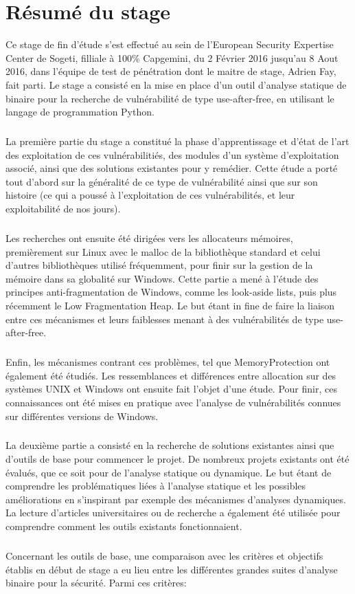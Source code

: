 \section*{Résumé du stage}
Ce stage de fin d'étude s'est effectué au sein de l'European Security Expertise Center de Sogeti, filliale à 100\% Capgemini, du 2 Février 2016 jusqu'au 8 Aout 2016, dans
l'équipe de test de pénétration dont le maitre de stage, Adrien Fay, fait parti. Le stage a consisté en la mise en place d'un outil d'analyse statique de binaire pour la recherche
de vulnérabilité de type use-after-free, en utilisant le langage de programmation Python.
\subparagraph{}
La première partie du stage a constitué la phase d'apprentissage et d'état de l'art des exploitation de ces vulnérabilitiés, des modules d'un système d'exploitation associé, ainsi que des solutions
existantes pour y remédier. Cette étude a porté tout d'abord sur la généralité de ce type de vulnérabilité ainsi que sur son histoire (ce qui a poussé à l'exploitation de ces vulnérabilités, et leur
exploitabilité de nos jours).
\subparagraph{}
Les recherches ont ensuite été dirigées vers les allocateurs mémoires, premièrement sur Linux avec le malloc de la bibliothèque standard et celui d'autres bibliothèques
utilisé fréquemment, pour finir sur la gestion de la mémoire dans sa globalité sur Windows. Cette partie a mené à l'étude des principes anti-fragmentation de Windows, comme les look-aside lists, puis
plus récemment le Low Fragmentation Heap. Le but étant in fine de faire la liaison entre ces mécanismes et leurs faiblesses menant à des vulnérabilités de type use-after-free.
\subparagraph{}
Enfin, les mécanismes contrant ces problèmes, tel que MemoryProtection ont également été étudiés. Les ressemblances et différences entre allocation sur des systèmes UNIX et Windows ont
ensuite fait l'objet d'une étude. Pour finir, ces connaissances ont été mises en pratique avec l'analyse de vulnérabilités connues sur différentes versions de Windows.
\subparagraph{}
La deuxième partie a consisté en la recherche de solutions existantes ainsi que d'outils de base pour commencer le projet. De nombreux projets existants ont été évalués, que ce soit pour de l'analyse statique ou dynamique. Le but étant de comprendre les problématiques liées à l'analyse statique et les possibles améliorations en s'inspirant par exemple des mécanismes d'analyses dynamiques.
La lecture d'articles universitaires ou de recherche a également été utilisée pour comprendre comment les outils existants fonctionnaient.
\subparagraph{}
Concernant les outils de base, une comparaison avec les critères et objectifs établis en début de stage a eu lieu entre les différentes grandes suites d'analyse binaire pour la sécurité. Parmi ces critères:
